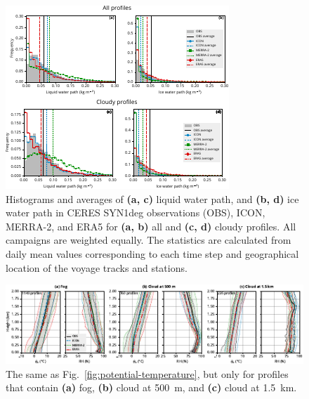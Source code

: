 \documentclass[draft,jgrga]{agutexSI2019}
\begin{document}
\begin{figure}[p!]
\includegraphics[width=\textwidth]{img/stats_hist_si.pdf}
\caption{
Histograms and averages of \textbf{(a, c)} liquid water path, and \textbf{(b, d)} ice water path in CERES SYN1deg observations (OBS), ICON,
MERRA-2, and ERA5 for \textbf{(a, b)} all and \textbf{(c, d)} cloudy profiles. All campaigns are weighted equally. The statistics are calculated from daily mean values corresponding to each time step and geographical location of the voyage tracks and stations.
}
\label{fig:stats-hist-si}
\end{figure}

\begin{figure}[t]
\centerline{
\includegraphics[width=1.2\textwidth]{img/rs_thetav_hur_cloud.pdf}
}
\caption{
The same as Fig.~\ref{fig:potential-temperature}, but only for profiles that contain \textbf{(a)} fog, \textbf{(b)} cloud at 500~m, and \textbf{(c)} cloud at 1.5~km.
}
\label{fig:rs-thetav-hur-cloud}
\end{figure}
\end{document}
